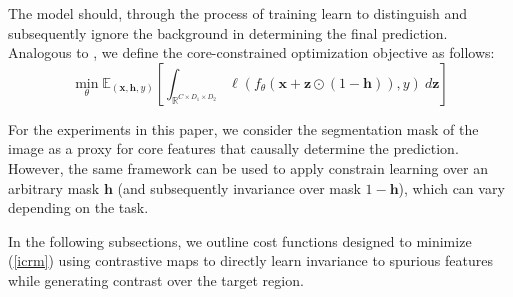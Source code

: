 \documentclass{article}
\theoremstyle{plain}
\theoremstyle{definition}
\theoremstyle{remark}
\begin{document}
The model should, through the process of training learn to distinguish and subsequently ignore the background in determining the final prediction. Analogous to \citep{singla2022core}, we define the core-constrained optimization objective as follows:
\begin{equation}\label{icrm}
	\min_\theta \mathbb{E}_{(\bm{x}, \bm{h}, y)} \left[ \int_{\mathbb{R}^{C \times D_1 \times D_2}} \ell(f_\theta(\bm{x} + \bm{z} \odot (1 - \bm{h})), y)~d\bm{z} \right]
\end{equation}

For the experiments in this paper, we consider the segmentation mask of the image as a proxy for core features that causally determine the prediction. However, the same framework can be used to apply constrain learning over an arbitrary mask $\bm{h}$ (and subsequently invariance over mask $1 - \bm{h}$), which can vary depending on the task.


In the following subsections, we outline cost functions designed to minimize (\ref{icrm}) using contrastive maps to directly learn invariance to spurious features while generating contrast over the target region.
\end{document}
